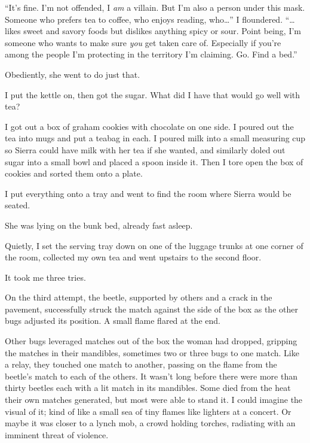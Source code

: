 ``It's fine.  I'm not offended, I \emph{am} a villain.  But I'm also a person under this mask.  Someone who prefers tea to coffee, who enjoys reading, who\ldots''  I floundered.  ``\ldots{}likes sweet and savory foods but dislikes anything spicy or sour.  Point being, I'm someone who wants to make sure \emph{you} get taken care of.  Especially if you're among the people I'm protecting in the territory I'm claiming.  Go.  Find a bed.''



Obediently, she went to do just that.



I put the kettle on, then got the sugar.  What did I have that would go well with tea?



I got out a box of graham cookies with chocolate on one side.  I poured out the tea into mugs and put a teabag in each.  I poured milk into a small measuring cup so Sierra could have milk with her tea if she wanted, and similarly doled out sugar into a small bowl and placed a spoon inside it.  Then I tore open the box of cookies and sorted them onto a plate.



I put everything onto a tray and went to find the room where Sierra would be seated.



She was lying on the bunk bed, already fast asleep.



Quietly, I set the serving tray down on one of the luggage trunks at one corner of the room, collected my own tea and went upstairs to the second floor.



\sectionbreak



It took me three tries.



On the third attempt, the beetle, supported by others and a crack in the pavement, successfully struck the match against the side of the box as the other bugs adjusted its position.  A small flame flared at the end.



Other bugs leveraged matches out of the box the woman had dropped, gripping the matches in their mandibles, sometimes two or three bugs to one match.  Like a relay, they touched one match to another, passing on the flame from the beetle's match to each of the others.  It wasn't long before there were more than thirty beetles each with a lit match in its mandibles.  Some died from the heat their own matches generated, but most were able to stand it.  I could imagine the visual of it; kind of like a small sea of tiny flames like lighters at a concert.  Or maybe it was closer to a lynch mob, a crowd holding torches, radiating with an imminent threat of violence.



